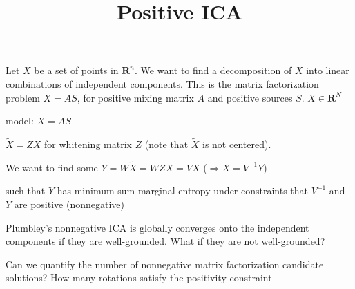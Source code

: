 \documentclass{article}
\title{Positive ICA}
\begin{document}
Let $X$ be a set of points in $\mathbf{R}^n$. We want to find a decomposition of $X$ into linear combinations of independent components. This is the matrix factorization problem $X = A S$, for positive mixing matrix $A$ and positive sources $S$. 
$X \in \mathbf{R}^N$

model: $X = A S$

$\tilde{X} = Z X$ for whitening matrix $Z$ (note that $\tilde{X}$ is not centered).

We want to find some
$Y = W \tilde{X} = W Z X = V X$ ($\Rightarrow X = V^{-1} Y$)

such that $Y$ has minimum sum marginal entropy under constraints that $V^{-1}$ and $Y$ are positive (nonnegative)



Plumbley's nonnegative ICA is globally converges onto the independent components if they are well-grounded. What if they are not well-grounded?

Can we quantify the number of nonnegative matrix factorization candidate solutions? How many rotations satisfy the positivity constraint
\end{document}
